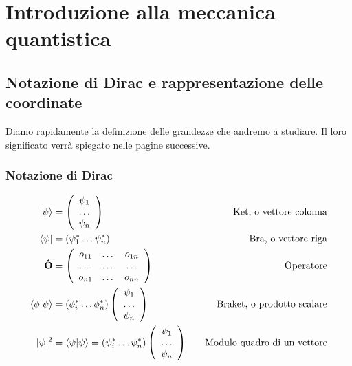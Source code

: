 \chapter{Introduzione alla meccanica quantistica}

\section{Notazione di Dirac e rappresentazione delle coordinate}
Diamo rapidamente la definizione delle grandezze che andremo a studiare. Il loro significato verrà spiegato nelle pagine successive.
\subsection{Notazione di Dirac}
\begin{align}
\ket{\psi} &= \left(
\begin{array}{ccc}\psi_1 \\ \dots \\ \psi_n\end{array}
\right) \quad &\text{Ket, o vettore colonna}\\
\bra{\psi} &= (\psi_1^* \dots \psi_n^*) \quad &\text{Bra, o vettore riga}\\
\mathbf{\hat O} &= \left(
\begin{array}{ccc}o_{11} & \dots & o_{1n} \\ \dots & \dots & \dots \\ o_{n1} & \dots & o_{nn}\end{array}
\right) \quad &\text{Operatore}\\
\braket{\phi | \psi} &= 
\left(\phi_i^* \dots \phi_n^* \right) \left(
\begin{array}{ccc}\psi_1 \\ \dots \\ \psi_n\end{array}
\right) \quad &\text{Braket, o prodotto scalare}\\	
|\psi|^2 &=\braket{\psi | \psi} = 
\left(\psi_i^* \dots \psi_n^* \right) \left(
\begin{array}{ccc}\psi_1 \\ \dots \\ \psi_n\end{array}
\right) \quad &\text{Modulo quadro di un vettore}
\end{align}
